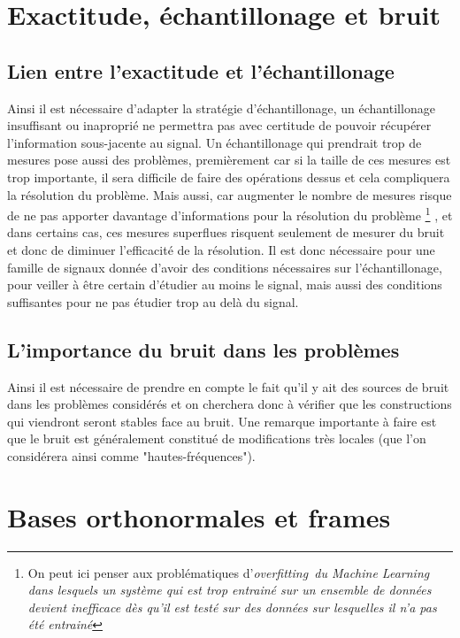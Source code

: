 \section{Exactitude, échantillonage et bruit}
\subsection{Lien entre l'exactitude et l'échantillonage}
Ainsi il est nécessaire d'adapter la stratégie d'échantillonage, un échantillonage insuffisant ou inaproprié ne permettra pas avec certitude de pouvoir récupérer l'information sous-jacente au signal.
Un échantillonage qui prendrait trop de mesures pose aussi des problèmes, premièrement car si la taille de ces mesures est trop importante, il sera difficile de faire des opérations dessus et cela compliquera la résolution du problème. 
Mais aussi, car augmenter le nombre de mesures risque de ne pas apporter davantage d'informations pour la résolution du problème \footnote{On peut ici penser aux problématiques d'\it{overfitting} du Machine Learning dans lesquels un système qui est trop entrainé sur un ensemble de données devient inefficace dès qu'il est testé sur des données sur lesquelles il n'a pas été entrainé}
, et dans certains cas, ces mesures superflues risquent seulement de mesurer du bruit et donc de diminuer l'efficacité de la résolution.
Il est donc nécessaire pour une famille de signaux donnée d'avoir des conditions nécessaires sur l'échantillonage, pour veiller à être certain d'étudier au moins le signal, mais aussi des conditions suffisantes pour ne pas étudier trop au delà du signal.
\subsection{L'importance du bruit dans les problèmes}
Ainsi il est nécessaire de prendre en compte le fait qu'il y ait des sources de bruit dans les problèmes considérés et on cherchera donc à vérifier que les constructions qui viendront seront stables face au bruit.
Une remarque importante à faire est que le bruit est généralement constitué de modifications très locales (que l'on considérera ainsi comme "hautes-fréquences").

\section{Bases orthonormales et frames}
